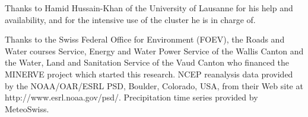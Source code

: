 \documentclass[twocol]{ametsoc}
\begin{document}



%
\acknowledgments
Thanks to Hamid Hussain-Khan of the University of Lausanne for his help and availability, and for the intensive use of the cluster he is in charge of.

Thanks to the Swiss Federal Office for Environment (FOEV), the Roads and Water courses Service, Energy and Water Power Service of the Wallis Canton and the Water, Land and Sanitation Service of the Vaud Canton who financed the MINERVE project which started this research. NCEP reanalysis data provided by the NOAA/OAR/ESRL PSD, Boulder, Colorado, USA, from their Web site at http://www.esrl.noaa.gov/psd/. Precipitation time series provided by MeteoSwiss. 


%



\end{document}
